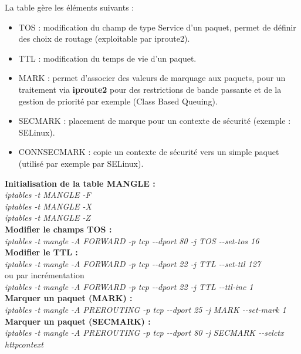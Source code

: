 \documentclass[a4paper,11pt]{article}				    %
\begin{document}
{
La table g\`ere les \'el\'ements suivants :
\begin{itemize}
	\item TOS : modification du champ de type Service d'un paquet, permet de d\'efinir des choix de routage (exploitable par iproute2).
	\item TTL : modification du temps de vie d'un paquet.
	\item MARK :	permet d'associer des valeurs de marquage aux paquets, pour un traitement 
						via \textbf{iproute2} pour des restrictions de bande passante et de la 
						gestion de priorit\'e par exemple (Class Based Queuing).
	\item SECMARK : placement de marque pour un contexte de s\'ecurit\'e (exemple : SELinux).
	\item CONNSECMARK : copie un contexte de s\'ecurit\'e vers un simple paquet (utilis\'e par exemple par SELinux).\\
\end{itemize}

\textbf{Initialisation de la table MANGLE : }\\
{\sl \color{blue}iptables -t MANGLE -F}\\
{\sl \color{blue}iptables -t MANGLE -X}\\
{\sl \color{blue}iptables -t MANGLE -Z}\\

\textbf{Modifier le champs TOS : }\\
{\sl \color{blue}iptables -t mangle -A FORWARD -p tcp {-}{-}dport 80 -j TOS {-}{-}set-tos 16}\\ 

\textbf{Modifier le TTL : }\\
{\sl \color{blue}iptables -t mangle -A FORWARD -p tcp {-}{-}dport 22 -j TTL {-}{-}set-ttl 127}\\
ou par incr\'ementation\\
{\sl \color{blue}iptables -t mangle -A FORWARD -p tcp {-}{-}dport 22 -j TTL {-}{-}ttl-inc 1}\\

\textbf{Marquer un paquet (MARK) : }\\
{\sl \color{blue}iptables -t mangle -A PREROUTING -p tcp {-}{-}dport 25 -j MARK {-}{-}set-mark 1}\\

\textbf{Marquer un paquet (SECMARK) : }\\
{\sl \color{blue}iptables -t mangle -A PREROUTING -p tcp {-}{-}dport 80 -j SECMARK {-}{-}selctx httpcontext}\\

}
\end{document}
